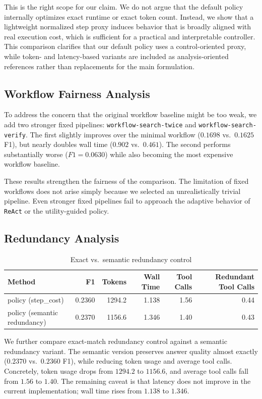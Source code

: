 This is the right scope for our claim. We do not argue that the default policy internally optimizes exact runtime or exact token count. Instead, we show that a lightweight normalized step proxy induces behavior that is broadly aligned with real execution cost, which is sufficient for a practical and interpretable controller. This comparison clarifies that our default policy uses a control-oriented proxy, while token- and latency-based variants are included as analysis-oriented references rather than replacements for the main formulation.
\subsection{Workflow Fairness Analysis}



To address the concern that the original workflow baseline might be too weak, we add two stronger fixed pipelines: \texttt{workflow-search-twice} and \texttt{workflow-search-verify}. The first slightly improves over the minimal workflow ($0.1698$ vs.\ $0.1625$ F1), but nearly doubles wall time ($0.902$ vs.\ $0.461$). The second performs substantially worse ($F1=0.0630$) while also becoming the most expensive workflow baseline.

These results strengthen the fairness of the comparison. The limitation of fixed workflows does not arise simply because we selected an unrealistically trivial pipeline. Even stronger fixed pipelines fail to approach the adaptive behavior of \texttt{ReAct} or the utility-guided policy.

\subsection{Redundancy Analysis}

\begin{table}[t]
\centering
\small
\caption{Exact vs.\ semantic redundancy control}
\begin{tabular}{lrrrrr}
\hline
Method & F1 & Tokens & Wall Time & Tool Calls & Redundant Tool Calls \\
\hline
policy (step\_cost) & 0.2360 & 1294.2 & 1.138 & 1.56 & 0.44 \\
policy (semantic redundancy) & 0.2370 & 1156.6 & 1.346 & 1.40 & 0.43 \\
\hline
\end{tabular}
\end{table}

We further compare exact-match redundancy control against a semantic redundancy variant. The semantic version preserves answer quality almost exactly ($0.2370$ vs.\ $0.2360$ F1), while reducing token usage and average tool calls. Concretely, token usage drops from $1294.2$ to $1156.6$, and average tool calls fall from $1.56$ to $1.40$. The remaining caveat is that latency does not improve in the current implementation; wall time rises from $1.138$ to $1.346$.

